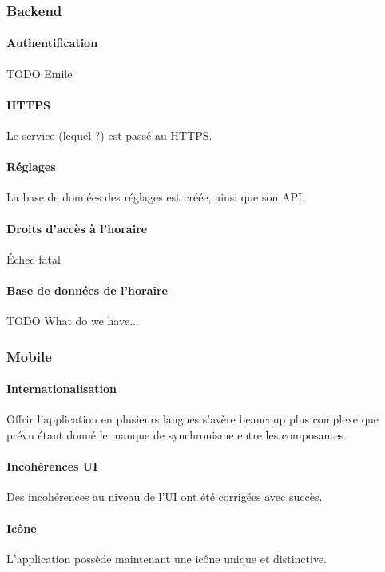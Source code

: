 \subsubsection{Backend}

\paragraph{Authentification} TODO Emile

\paragraph{HTTPS} Le service (lequel ?) est passé au HTTPS.

\paragraph{Réglages} La base de données des réglages est créée, ainsi que son API.

\paragraph{Droits d'accès à l'horaire} Échec fatal \rWalley

\paragraph{Base de données de l'horaire} TODO What do we have...
	
\subsubsection{Mobile}

\paragraph{Internationalisation} Offrir l'application en plusieurs langues s'avère beaucoup plus complexe que prévu étant donné le manque de synchronisme entre les composantes.

\paragraph{Incohérences UI} Des incohérences au niveau de l'UI ont été corrigées avec succès. 

\paragraph{Icône} L'application possède maintenant une icône unique et distinctive.

